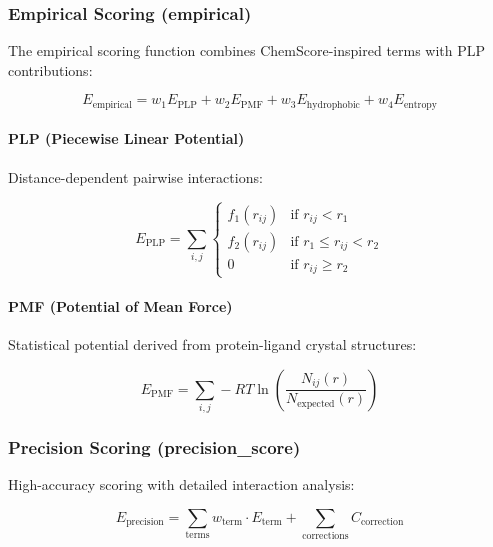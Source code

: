 \documentclass[11pt,a4paper]{article}
\begin{document}
\subsubsection{Empirical Scoring (empirical)}

The empirical scoring function combines ChemScore-inspired terms with PLP contributions:

\begin{equation}
E_{\text{empirical}} = w_1 E_{\text{PLP}} + w_2 E_{\text{PMF}} + w_3 E_{\text{hydrophobic}} + w_4 E_{\text{entropy}}
\end{equation}

\paragraph{PLP (Piecewise Linear Potential)}
Distance-dependent pairwise interactions:

\begin{equation}
E_{\text{PLP}} = \sum_{i,j} \begin{cases}
f_1(r_{ij}) & \text{if } r_{ij} < r_1 \\
f_2(r_{ij}) & \text{if } r_1 \leq r_{ij} < r_2 \\
0 & \text{if } r_{ij} \geq r_2
\end{cases}
\end{equation}

\paragraph{PMF (Potential of Mean Force)}
Statistical potential derived from protein-ligand crystal structures:

\begin{equation}
E_{\text{PMF}} = \sum_{i,j} -RT \ln\left(\frac{N_{ij}(r)}{N_{\text{expected}}(r)}\right)
\end{equation}

\subsubsection{Precision Scoring (precision\_score)}

High-accuracy scoring with detailed interaction analysis:

\begin{equation}
E_{\text{precision}} = \sum_{\text{terms}} w_{\text{term}} \cdot E_{\text{term}} + \sum_{\text{corrections}} C_{\text{correction}}
\end{equation}
\end{document}
